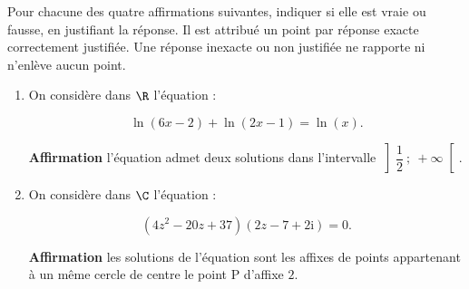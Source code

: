 \documentclass{cornouaille}
\begin{document}
\begin{exercice}
Pour chacune des quatre affirmations suivantes,
 indiquer si elle est vraie ou fausse, 
en justifiant la réponse.
 Il est attribué un point par réponse exacte correctement justifiée.
 Une réponse inexacte ou
non justifiée ne rapporte ni n'enlève aucun point.

\begin{enumerate}

\item  On considère dans $\R$ l'équation :

\[\ln (6 x - 2) + \ln (2x - 1) = \ln (x).\]



\textbf{Affirmation} l'équation admet deux solutions dans l'intervalle $\left]\dfrac{1}{2}~;~+ \infty\right[$.
\item  On considère dans $\C$ l'équation : 

\[\left(4z^2 - 20z + 37\right)(2z -7 + 2\text{i}) = 0.\]



\textbf{Affirmation} les solutions de l'équation sont les affixes de points appartenant à un même
cercle de centre le point P d'affixe $2$.
\end{enumerate}
\end{exercice}
\end{document}
